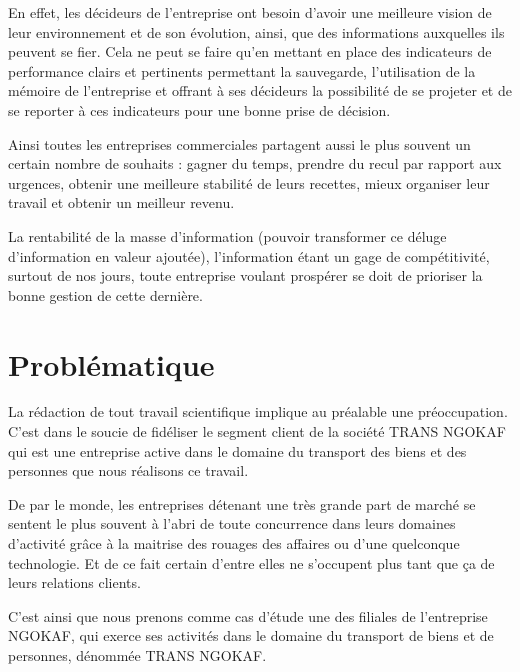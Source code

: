     En effet, les décideurs de l’entreprise ont besoin d’avoir une meilleure vision de
    leur environnement et de son évolution, ainsi, que des informations auxquelles ils peuvent
    se fier. Cela ne peut se faire qu’en mettant en place des indicateurs de performance clairs
    et pertinents permettant la sauvegarde, l’utilisation de la mémoire de l’entreprise et offrant
    à ses décideurs la possibilité de se projeter et de se reporter à ces indicateurs pour une bonne
    prise de décision.
    \newline

    Ainsi toutes les entreprises commerciales partagent aussi
    le plus souvent un certain nombre de souhaits : gagner
    du temps, prendre du recul par rapport aux urgences, obtenir une meilleure
    stabilité de leurs recettes, mieux organiser leur travail et obtenir un meilleur
    revenu. \cite*{Barouch2010}
    \newline

    La rentabilité de la masse d’information (pouvoir transformer ce déluge
    d’information en valeur ajoutée), l’information étant un gage de compétitivité, surtout
    de nos jours, toute entreprise voulant prospérer se doit de prioriser la bonne gestion de
    cette dernière.

    \section[Problématique]{Problématique}
    La rédaction de tout travail scientifique implique au préalable une préoccupation.
    C’est dans le soucie de fidéliser le segment client de la société TRANS NGOKAF qui est une
    entreprise active dans le domaine du transport des biens et des personnes que nous
    réalisons ce travail.
    \newline
        
    De par le monde, les entreprises détenant une très grande part de marché
    se sentent le plus souvent à l’abri de toute concurrence
    dans leurs domaines d’activité grâce à la maitrise des rouages des affaires
    ou d’une quelconque technologie. \cite*{Rouviere2010} Et de ce fait
    certain d’entre elles ne s’occupent plus tant que ça de leurs relations clients.
    \newline

    C’est ainsi que nous prenons comme cas d’étude une des filiales de l’entreprise NGOKAF,
    qui exerce ses activités dans le domaine du transport de biens et de personnes, dénommée
    TRANS NGOKAF.
    \newline


